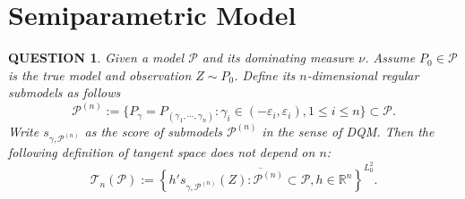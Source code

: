 \documentclass[12pt]{article}
\renewcommand{\(}{\left(}%
\renewcommand{\)}{\right)}%
\renewcommand{\[}{\left[}%
\renewcommand{\]}{\right]}%
\renewcommand{\r}{\mathbb{R}}
\newtheorem{question}{QUESTION}[section]}
\begin{document}
\section{Semiparametric Model}
\begin{question}
	Given a model $\mathcal{P}$ and its dominating measure $\nu$. Assume $P_0\in \mathcal{P}$ is the true model and observation $Z\sim P_0$. Define its $n$-dimensional regular submodels as follows
	\begin{equation*}
		 \mathcal{P}^{(n)}:=\{P_\gamma=P_{(\gamma_1,\cdots,\gamma_n)} :\gamma_i\in(-\varepsilon_i,\varepsilon_i),1\leq i\leq n\}\subset \mathcal{P}.
	\end{equation*}
	Write $s_{\gamma,\mathcal{P}^{(n)}}$ as the score of submodels $\mathcal{P}^{(n)}$ in the sense of DQM. Then the following definition of tangent space does not depend on $n$:
	\begin{equation*}
			\mathcal{T}_n(\mathcal{P}):=\overline{\left\{h's_{\gamma,\mathcal{P}^{(n)}}(Z) :\mathcal{P}^{(n)}\subset \mathcal{P},h\in\r^n\right\}}^{L^2_0}.
		\end{equation*}
\end{question}
\end{document}
